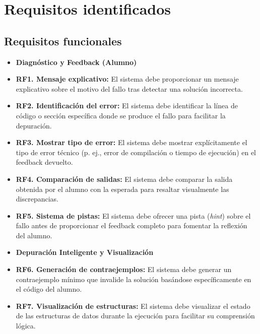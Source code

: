 \section{Requisitos identificados}
\subsection{Requisitos funcionales}
\begin{itemize}
    \item[] \textbf{Diagnóstico y Feedback (Alumno)}
    \item \textbf{RF1. Mensaje explicativo:} El sistema debe proporcionar un mensaje explicativo sobre el motivo del fallo tras detectar una solución incorrecta.
    \item \textbf{RF2. Identificación del error:} El sistema debe identificar la línea de código o sección específica donde se produce el fallo para facilitar la depuración.
    \item \textbf{RF3. Mostrar tipo de error:} El sistema debe mostrar explícitamente el tipo de error técnico (p. ej., error de compilación o tiempo de ejecución) en el feedback devuelto.
    \item \textbf{RF4. Comparación de salidas:} El sistema debe comparar la salida obtenida por el alumno con la esperada para resaltar visualmente las discrepancias.
    \item \textbf{RF5. Sistema de pistas:} El sistema debe ofrecer una pista (\textit{hint}) sobre el fallo antes de proporcionar el feedback completo para fomentar la reflexión del alumno.

    \item[] \textbf{Depuración Inteligente y Visualización}
    \item \textbf{RF6. Generación de contraejemplos:} El sistema debe generar un contraejemplo mínimo que invalide la solución basándose específicamente en el código del alumno.
    \item \textbf{RF7. Visualización de estructuras:} El sistema debe visualizar el estado de las estructuras de datos durante la ejecución para facilitar su comprensión lógica.


\end{itemize}
